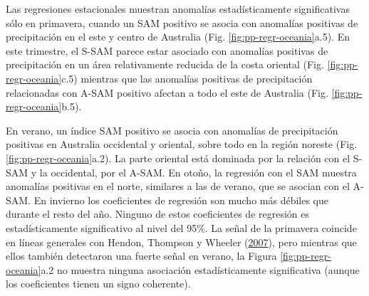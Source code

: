 \documentclass[12pt,oneside,a4paper]{reedthesis}
\begin{document}
Las regresiones estacionales muestran anomalías estadísticamente significativas sólo en primavera, cuando un SAM positivo se asocia con anomalías positivas de precipitación en el este y centro de Australia (Fig. \ref{fig:pp-regr-oceania}a.5).
En este trimestre, el S-SAM parece estar asociado con anomalías positivas de precipitación en un área relativamente reducida de la costa oriental (Fig. \ref{fig:pp-regr-oceania}c.5) mientras que las anomalías positivas de precipitación relacionadas con A-SAM positivo afectan a todo el este de Australia (Fig. \ref{fig:pp-regr-oceania}b.5).

En verano, un índice SAM positivo se asocia con anomalías de precipitación positivas en Australia occidental y oriental, sobre todo en la región noreste (Fig. \ref{fig:pp-regr-oceania}a.2).
La parte oriental está dominada por la relación con el S-SAM y la occidental, por el A-SAM.
En otoño, la regresión con el SAM muestra anomalías positivas en el norte, similares a las de verano, que se asocian con el A-SAM.
En invierno los coeficientes de regresión son mucho más débiles que durante el resto del año.
Ninguno de estos coeficientes de regresión es estadísticamente significativo al nivel del 95\%.
La señal de la primavera coincide en líneas generales con Hendon, Thompson y Wheeler (\protect\hyperlink{ref-hendon2007}{2007}), pero mientras que ellos también detectaron una fuerte señal en verano, la Figura \ref{fig:pp-regr-oceania}a.2 no muestra ninguna asociación estadísticamente significativa (aunque los coeficientes tienen un signo coherente).
\end{document}
